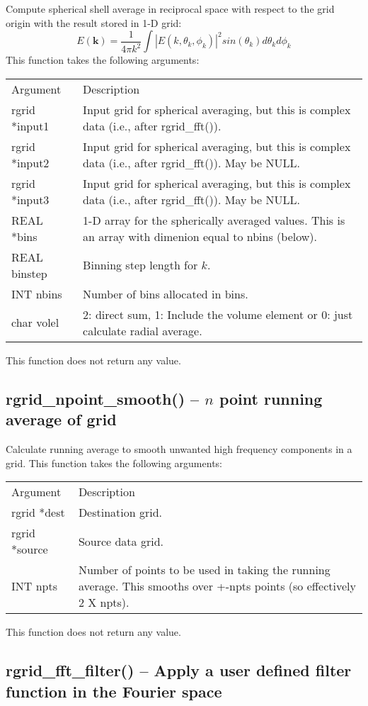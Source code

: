 \documentclass[12pt,letterpaper]{report}
\begin{document}
Compute spherical shell average in reciprocal space with respect to the grid origin with the result stored in 1-D grid:
$$E(\mathbf{k}) = \frac{1}{4\pi k^2} \int |E(k, \theta_k, \phi_k)|^2 sin(\theta_k) d\theta_k d\phi_k$$
This function takes the following arguments:
\begin{longtable}{p{} p{}}
Argument & Description\\
\cline{1-2}
rgrid *input1 & Input grid for spherical averaging, but this is complex data (i.e., after rgrid\_fft()).\\
rgrid *input2 & Input grid for spherical averaging, but this is complex data (i.e., after rgrid\_fft()). May be NULL.\\
rgrid *input3 & Input grid for spherical averaging, but this is complex data (i.e., after rgrid\_fft()). May be NULL.\\
REAL *bins & 1-D array for the spherically averaged values. This is an array with dimenion equal to nbins (below).\\
REAL binstep & Binning step length for $k$.\\
INT nbins & Number of bins allocated in bins.\\
char volel & 2: direct sum, 1: Include the volume element or 0: just calculate radial average.\\
\end{longtable}
\noindent
This function does not return any value. 

\subsection{rgrid\_npoint\_smooth() -- $n$ point running average of grid}

Calculate running average to smooth unwanted high frequency components in a grid. This function takes the following arguments:
\begin{longtable}{p{} p{}}
Argument & Description\\
\cline{1-2}
rgrid *dest & Destination grid.\\
rgrid *source & Source data grid.\\
INT npts & Number of points to be used in taking the running average. This smooths over +-npts points (so effectively 2 X npts).\\
\end{longtable}
\noindent
This function does not return any value.

\subsection{rgrid\_fft\_filter() -- Apply a user defined filter function in the Fourier space}
\end{document}
